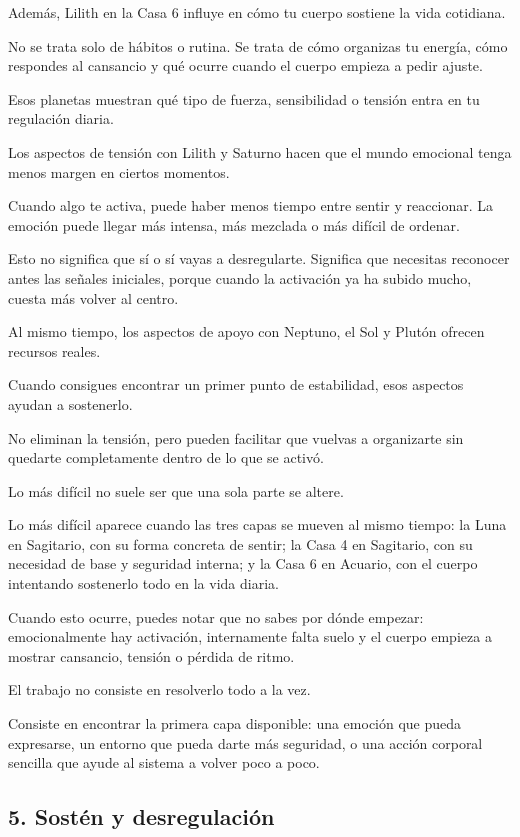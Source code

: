 \documentclass[11pt,a4paper]{article}
\begin{document}
Además, Lilith en la Casa 6 influye en cómo tu cuerpo sostiene la vida cotidiana.

No se trata solo de hábitos o rutina. Se trata de cómo organizas tu energía, cómo respondes al cansancio y qué ocurre cuando el cuerpo empieza a pedir ajuste.

Esos planetas muestran qué tipo de fuerza, sensibilidad o tensión entra en tu regulación diaria.

Los aspectos de tensión con Lilith y Saturno hacen que el mundo emocional tenga menos margen en ciertos momentos.

Cuando algo te activa, puede haber menos tiempo entre sentir y reaccionar. La emoción puede llegar más intensa, más mezclada o más difícil de ordenar.

Esto no significa que sí o sí vayas a desregularte. Significa que necesitas reconocer antes las señales iniciales, porque cuando la activación ya ha subido mucho, cuesta más volver al centro.

Al mismo tiempo, los aspectos de apoyo con Neptuno, el Sol y Plutón ofrecen recursos reales.

Cuando consigues encontrar un primer punto de estabilidad, esos aspectos ayudan a sostenerlo.

No eliminan la tensión, pero pueden facilitar que vuelvas a organizarte sin quedarte completamente dentro de lo que se activó.

Lo más difícil no suele ser que una sola parte se altere.

Lo más difícil aparece cuando las tres capas se mueven al mismo tiempo:
la Luna en Sagitario, con su forma concreta de sentir;
la Casa 4 en Sagitario, con su necesidad de base y seguridad interna;
y la Casa 6 en Acuario, con el cuerpo intentando sostenerlo todo en la vida diaria.

Cuando esto ocurre, puedes notar que no sabes por dónde empezar: emocionalmente hay activación, internamente falta suelo y el cuerpo empieza a mostrar cansancio, tensión o pérdida de ritmo.

El trabajo no consiste en resolverlo todo a la vez.

Consiste en encontrar la primera capa disponible: una emoción que pueda expresarse, un entorno que pueda darte más seguridad, o una acción corporal sencilla que ayude al sistema a volver poco a poco.

\subsection{5. Sostén y desregulación}
\end{document}
